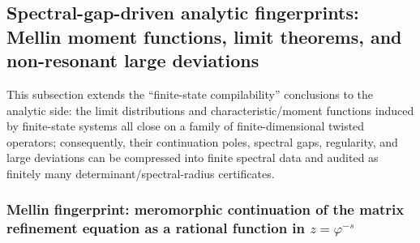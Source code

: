 \subsection{Spectral-gap-driven analytic fingerprints: Mellin moment functions, limit theorems, and non-resonant large deviations}\label{subsec:operator-mellin-spectral-fingerprint}

This subsection extends the ``finite-state compilability'' conclusions to the analytic side: the limit distributions and characteristic/moment functions induced by finite-state systems all close on a family of finite-dimensional twisted operators; consequently, their continuation poles, spectral gaps, regularity, and large deviations can be compressed into finite spectral data and audited as finitely many determinant/spectral-radius certificates.

\subsubsection{Mellin fingerprint: meromorphic continuation of the matrix refinement equation as a rational function in \texorpdfstring{$z=\varphi^{-s}$}{z=phi(-s)}}

